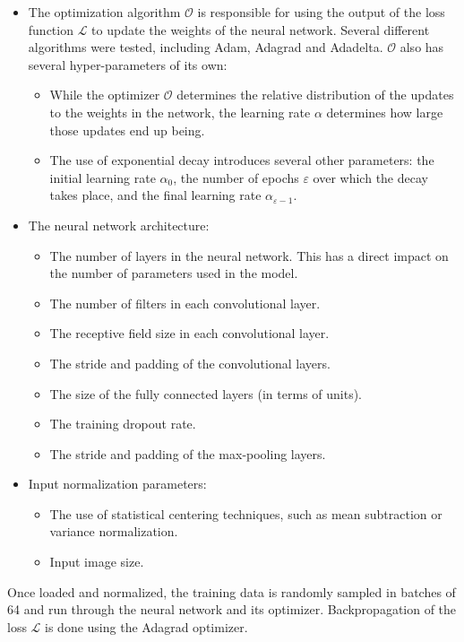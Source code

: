 \documentclass[12pt]{article}
\begin{document}
\begin{itemize}
	\item The optimization algorithm $\mathcal{O}$ is responsible for using the output of the loss function $\mathcal{L}$ to update the weights of the neural network. Several different algorithms were tested, including Adam, Adagrad and Adadelta. $\mathcal{O}$ also has several hyper-parameters of its own:
	\begin{itemize}
	\item While the optimizer $\mathcal{O}$ determines the relative distribution of the updates to the weights in the network, the learning rate $\alpha$ determines how large those updates end up being.
	\item The use of exponential decay introduces several other parameters: the initial learning rate $\alpha_0$, the number of epochs $\varepsilon$ over which the decay takes place, and the final learning rate $\alpha_{\varepsilon-1}$.
	\end{itemize}

	\item The neural network architecture:
	\begin{itemize}
		\item The number of layers in the neural network. This has a direct impact on the number of parameters used in the model.
		\item The number of filters in each convolutional layer.
		\item The receptive field size in each convolutional layer.
		\item The stride and padding of the convolutional layers.
		\item The size of the fully connected layers (in terms of units).
		\item The training dropout rate.
		\item The stride and padding of the max-pooling layers.
	\end{itemize}

	\item Input normalization parameters:
	\begin{itemize}
		\item The use of statistical centering techniques, such as mean subtraction or variance normalization.
		\item Input image size.
	\end{itemize}
\end{itemize}

Once loaded and normalized, the training data is randomly sampled in batches of 64 and run through the neural network and its optimizer.
Backpropagation of the loss $\mathcal{L}$ is done using the Adagrad optimizer.
\end{document}
